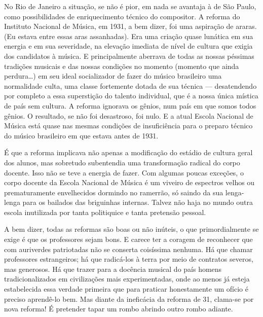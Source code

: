 No Rio de Janeiro a situação, se não é pior, em nada se avantaja à de
São Paulo, como possibilidades de enriquecimento técnico do compositor.
A reforma do Instituto Nacional de Música, em 1931, a bem dizer, foi uma
aspiração de araras. (Eu estava entre essas aras assanhadas). Era uma
criação quase lunática em sua energia e em sua severidade, na elevação
imediata de nível de cultura que exigia dos candidatos à música. E
principalmente aberrava de todas as nossas péssimas tradições musicais e
das nossas condições no momento (momento que ainda perdura\ldots{}) em seu
ideal socializador de fazer do músico brasileiro uma normalidade culta,
uma classe fortemente dotada de sua técnica --- desatendendo por completo
a essa superstição do talento individual, que é a nossa única mística de
país sem cultura. A reforma ignorava os gênios, num país em que somos
todos gênios. O resultado, se não foi desastroso, foi nulo. E a atual
Escola Nacional de Música está quase nas mesmas condições de
insuficiência para o preparo técnico do músico brasileiro em que estava
antes de 1931.

É que a reforma implicava não apenas a modificação do estádio de cultura
geral dos alunos, mas sobretudo subentendia uma transformação radical do
corpo docente. Isso não se teve a energia de fazer. Com algumas poucas
exceções, o corpo docente da Escola Nacional de Música é um viveiro de
espectros velhos ou prematuramente envelhecidos dormindo no ramerrão, só
saindo da sua lenga-lenga para os bailados das briguinhas internas.
Talvez não haja no mundo outra escola inutilizada por tanta politiquice
e tanta pretensão pessoal.

A bem dizer, todas as reformas são boas ou não inúteis, o que
primordialmente se exige é que os professores sejam bons. E carece ter a
coragem de reconhecer que com auriverdes patriotadas não se conserta
coisíssima nenhuma. Há que chamar professores estrangeiros; há que
radicá-los à terra por meio de contratos severos, mas generosos. Há que
trazer para a docência musical do país homens tradicionalizados em
civilizações mais experimentadas, onde ao menos já esteja estabelecida
essa verdade primeira que para praticar honestamente um ofício é preciso
aprendê-lo bem. Mas diante da ineficácia da reforma de 31, clama-se por
nova reforma! É pretender tapar um rombo abrindo outro rombo adiante.

